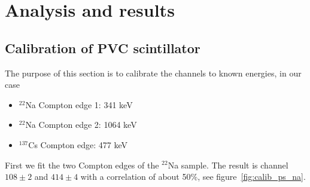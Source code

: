 \section{Analysis and results}
\label{sec:analysis}

\subsection{Calibration of PVC scintillator}
\label{sub:calibration}
The purpose of this section is to calibrate the channels to known energies, in our case
\begin{itemize}
\item $^{22}$Na Compton edge 1: 341 keV
\item $^{22}$Na Compton edge 2: 1064 keV
\item $^{137}$Cs Compton edge: 477 keV
\end{itemize}
First we fit the two Compton edges of the $^{22}$Na sample. The result is
channel $108 \pm 2$ and $414 \pm 4$ with a correlation of about 50\%, see
figure~\ref{fig:calib_ps_na}.

